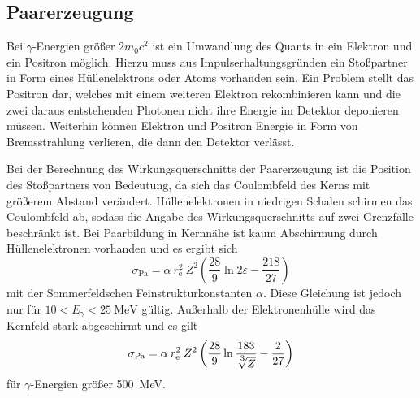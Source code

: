 \subsection{Paarerzeugung}
\label{sec:Paarerzeugung}

Bei $\gamma$-Energien größer $2 m_0 c^2$ ist ein Umwandlung des Quants in ein
Elektron und ein Positron möglich.
Hierzu muss aus Impulserhaltungsgründen ein Stoßpartner in Form eines Hüllenelektrons
oder Atoms vorhanden sein.
Ein Problem stellt das Positron dar, welches mit einem weiteren Elektron rekombinieren
kann und die zwei daraus entstehenden Photonen nicht ihre Energie im Detektor deponieren
müssen.
Weiterhin können Elektron und Positron Energie in Form von Bremsstrahlung verlieren, die dann
den Detektor verlässt.

Bei der Berechnung des Wirkungsquerschnitts der Paarerzeugung ist die Position des Stoßpartners
von Bedeutung, da sich das Coulombfeld des Kerns mit größerem Abstand verändert.
Hüllenelektronen in niedrigen Schalen schirmen das Coulombfeld ab, sodass die
Angabe des Wirkungsquerschnitts auf zwei Grenzfälle beschränkt ist.
Bei Paarbildung in Kernnähe ist kaum Abschirmung durch Hüllenelektronen vorhanden
und es ergibt sich
\begin{equation*}
	\sigma_\text{Pa} = \alpha\:r_\text{e}^2\:Z^2
	\left(\frac{28}{9} \ln2\varepsilon - \frac{218}{27}\right)
\end{equation*}
mit der Sommerfeldschen Feinstrukturkonstanten $\alpha$.
Diese Gleichung ist jedoch nur für $10 < E_\gamma < \SI{25}{\mega\electronvolt}$ gültig.
Außerhalb der Elektronenhülle wird das Kernfeld stark abgeschirmt und es gilt
\begin{equation*}
	\sigma_\text{Pa} = \alpha\:r_\text{e}^2\:Z^2
	\left(\frac{28}{9} \ln\frac{183}{\sqrt[\leftroot{-1}\uproot{2}\scriptstyle 3]Z} - \frac{2}{27}\right)
\end{equation*}
für $\gamma$-Energien größer \SI{500}{\mega\electronvolt}.

